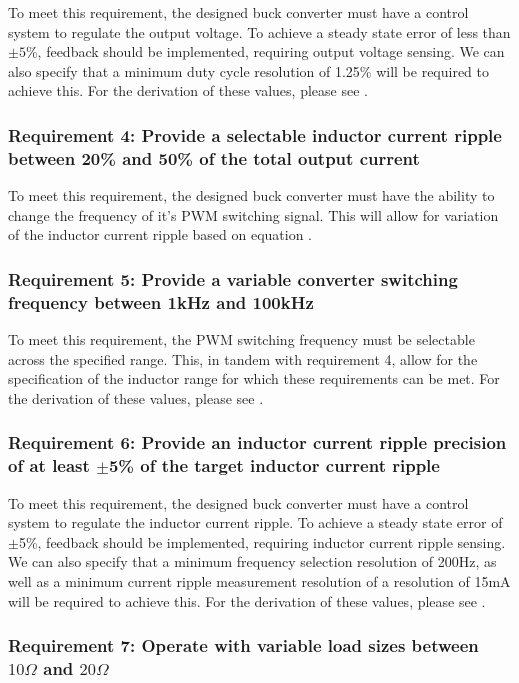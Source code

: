 To meet this requirement, the designed buck converter must have a control system to regulate the output voltage. To achieve a steady state error of less than $\pm5\%$, feedback should be implemented, requiring output voltage sensing. We can also specify that a minimum duty cycle resolution of 1.25\% will be required to achieve this. For the derivation of these values, please see .

\subsubsection*{Requirement 4: Provide a selectable inductor current ripple between 20\% and 50\% of the total output current}

To meet this requirement, the designed buck converter must have the ability to change the frequency of it's PWM switching signal. This will allow for variation of the inductor current ripple based on equation . 

\subsubsection*{Requirement 5: Provide a variable converter switching frequency between 1kHz and 100kHz}

To meet this requirement, the PWM switching frequency must be selectable across the specified range. This, in tandem with requirement 4, allow for the specification of the inductor range for which these requirements can be met. For the derivation of these values, please see .

\subsubsection*{Requirement 6: Provide  an  inductor  current  ripple  precision  of  at  least $\pm$5\%  of  the  target  inductor current ripple}

To meet this requirement, the designed buck converter must have a control system to regulate the inductor current ripple. To achieve a steady state error of $\pm$5\%, feedback should be implemented, requiring inductor current ripple sensing. We can also specify that a minimum frequency selection resolution of 200Hz, as well as a minimum current ripple measurement resolution of a resolution of 15mA will be required to achieve this. For the derivation of these values, please see .  


\subsubsection*{Requirement 7: Operate with variable load sizes between $10\Omega$ and $20\Omega$}

